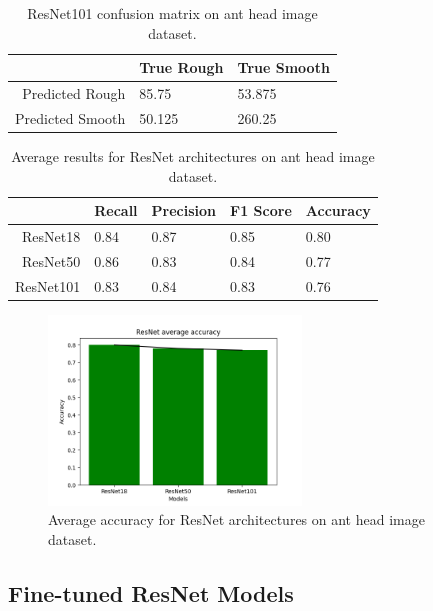 \documentclass{aci}
\numberwithin{equation}{section}
\begin{document}
\begin{table}[h]
    \centering
    \caption{ResNet101 confusion matrix on ant head image dataset.}
    \begin{tabular}{r|ll}
                         & True Rough & True Smooth \\
        \hline
        Predicted Rough  & 85.75      & 53.875      \\
        Predicted Smooth & 50.125     & 260.25      \\
    \end{tabular}
    \label{tab:resnet101_confusion_matrix}
\end{table}

\begin{table}[h]
    \centering
    \caption{Average results for ResNet architectures on ant head image dataset.}
    \begin{tabular}{r|llll}
                  & Recall & Precision & F1 Score & Accuracy \\
        \hline
        ResNet18  & 0.84   & 0.87      & 0.85     & 0.80     \\
        ResNet50  & 0.86   & 0.83      & 0.84     & 0.77     \\
        ResNet101 & 0.83   & 0.84      & 0.83     & 0.76     \\
    \end{tabular}
    \label{tab:resnet_results}
\end{table}

\begin{figure}[h]
    \centering
    \includegraphics[width=0.6\textwidth]{thesis_assets/plots/resnet_average.png}
    \caption{Average accuracy for ResNet architectures on ant head image dataset.}
    \label{fig:resnet_results}
\end{figure}

\clearpage
\subsection{Fine-tuned ResNet Models}
\end{document}
